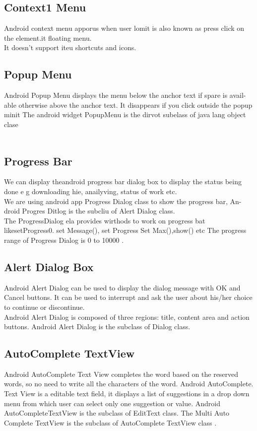 \documentclass[twoside,a4paper,16pt]{book}
\begin{document}
\begin{itemize}
\begin{enumerate}
\begin{enumerate}
\subsection{Context1 Menu}
 Android context menu apporus when user lomit is also known as press click on the element.it floating menu. \\
It doesn't support iteu shortcuts and icons.\\


\subsection{Popup Menu}
 Android Popup Menu displays the menu below the anchor text if spare is avail- able otherwise above the anchor text. It disappears if you click outside the popup minit The android widget PopupMenu is the dirvot subelass of java lang object clase \\\\
\subsection{Progress Bar}
We can display theandroid progress bar dialog box to  display the status being done e g downloading hie, anailyving, status of work etc.\\
 We are using android app Progress Dialog class to show the progress bar, An- droid Progres Ditlog is the subcliu of Alert Dialog class.\\
 The ProgressDialog ela provides wirthods to work on progress bat likesetProgress0. set Message(), set Progress Set Max(),show() etc
 The progress range of Progress Dialog is 0 to 10000 .\\

\subsection{Alert Dialog Box}
Android Alert Dialog can be used to display the dialog message with OK and Cancel buttons. It can be used to interrupt and ask the user about his/her choice to continue or discontinue.\\
 Android Alert Dialog is composed of three regions: title, content area and action buttons. Android Alert Dialog is the subclass of Dialog class.\\

\subsection{AutoComplete TextView }
Android AutoComplete Text View completes the word based on the reserved words, so no need to write all the characters of the word. Android AutoComplete. Text View is a editable text field, it displays a list of suggestions in a drop down menu from which user can select only one suggestion or value.
Android AutoCompleteTextView is the subclass of EditText class. The Multi Auto Complete TextView is the subclass of AutoComplete TextView class .\\


\end{enumerate}
\end{enumerate}
\end{itemize}
\end{document}
